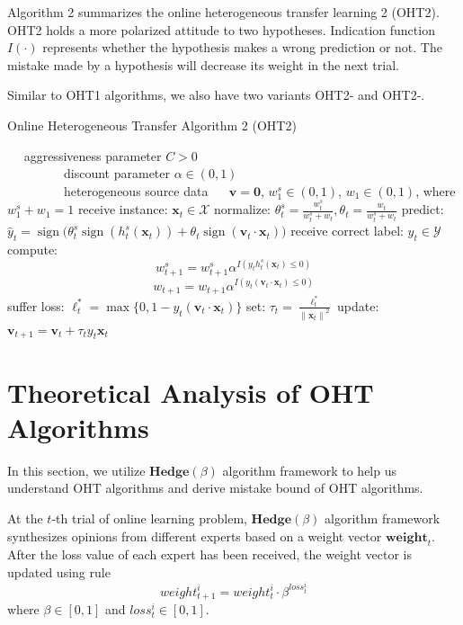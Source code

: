 \documentclass[letterpaper]{article}
\theoremstyle{remark}
\theoremstyle{definition}
\DeclareMathOperator{\sign}{sign}
\begin{document}
Algorithm 2 summarizes the online heterogeneous transfer learning 2 (OHT2).
OHT2 holds a more polarized attitude to two hypotheses.
Indication function $I(\cdot)$ represents whether the hypothesis makes a wrong prediction or not.
The mistake made by a hypothesis will decrease its weight in the next trial.

Similar to OHT1 algorithms, we also have two variants OHT2-\uppercase\expandafter{} and OHT2-\uppercase\expandafter{}.

\begin{algorithm}
\begin{algorithmic}[1]
\caption{Online Heterogeneous Transfer Algorithm 2 (OHT2)}
\REQUIRE ~~
aggressiveness parameter $C>0$\\ 
~~~~~~~~~discount parameter $\alpha \in (0,1)$\\ 
~~~~~~~~~heterogeneous source data 
\ENSURE ~~
$\mathbf{v} = \mathbf{0}$, $w_{1}^{s} \in (0,1)$, $w_{1} \in (0,1)$, where $w_{1}^{s} + w_1 = 1$
\STATE 
  receive instance: $\mathbf{x}_t \in \mathcal{X}$
\STATE
  normalize: $\theta_{t}^{s} = \frac{w_{t}^{s}}{w_{t}^{s}+w_t}, \theta_{t} = \frac{w_{t}}{w_{t}^{s}+w_t}$
\STATE
  predict: $\hat{y}_t = \sign \big( \theta_{t}^{s} \sign (h_{t}^{s}(\mathbf{x}_t)) + \theta_{t} \sign (\mathbf{v}_t \cdot \mathbf{x}_t) \big)$
\STATE
  receive correct label: $y_t \in \mathcal{Y}$
\STATE
  compute: 
    $$w_{t+1}^{s} = w_{t+1}^{s} \alpha ^ {I(y_t h_{t}^{s}(\mathbf{x}_t) \leq 0)}  $$
    $$w_{t+1} = w_{t+1} \alpha ^ {I(y_t (\mathbf{v}_t \cdot \mathbf{x}_t) \leq 0)}  $$
\STATE
  suffer loss: $\ell_{t}^{*} = \max \{0, 1-y_t(\mathbf{v}_t \cdot \mathbf{x}_t)\}$
\STATE
  set: $\tau_t = \frac{\ell_{t}^{*}}{{\|\mathbf{x}_t\|}^2}$
\STATE
  update: $ \mathbf{v}_{t+1} = \mathbf{v}_t + \tau_t y_t \mathbf{x}_t $
\ENDFOR
\end{algorithmic}
\end{algorithm}


\section{Theoretical Analysis of OHT Algorithms}
In this section, we utilize $\mathbf{Hedge}(\beta)$ algorithm framework to help us understand OHT algorithms and derive mistake bound of OHT algorithms.

At the $t$-th trial of online learning problem, $\mathbf{Hedge}(\beta)$ algorithm framework synthesizes opinions from different experts based on a weight vector $\mathbf{weight}_t$.
After the loss value of each expert has been received, the weight vector is updated using rule
$$ weight_{t+1}^{i} = weight_{t}^{i} \cdot \beta^{loss_{t}^{i}} $$
where $\beta \in [0,1]$ and $loss_{t}^{i} \in [0,1]$.
\end{document}
